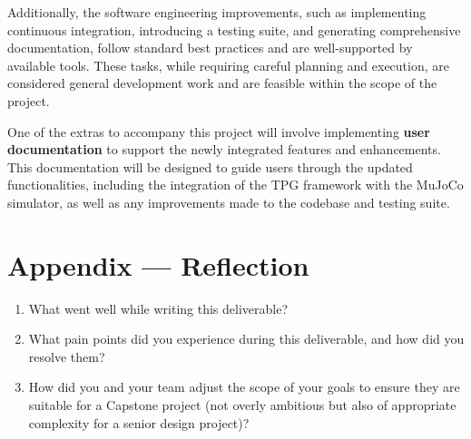 \documentclass{article}
\begin{document}
Additionally, the software engineering improvements, such as implementing continuous integration, introducing a testing suite, and generating comprehensive documentation, follow standard best practices and are well-supported by available tools. These tasks, while requiring careful planning and execution, are considered general development work and are feasible within the scope of the project.

One of the extras to accompany this project will involve implementing \textbf{user documentation} to support the newly integrated features and enhancements. This documentation will be designed to guide users through the updated functionalities, including the integration of the TPG framework with the MuJoCo simulator, as well as any improvements made to the codebase and testing suite.

\newpage{}

\section*{Appendix --- Reflection}




\begin{enumerate}
    \item What went well while writing this deliverable? 
    \item What pain points did you experience during this deliverable, and how
    did you resolve them?
    \item How did you and your team adjust the scope of your goals to ensure
    they are suitable for a Capstone project (not overly ambitious but also of
    appropriate complexity for a senior design project)?
\end{enumerate}  
\end{document}
